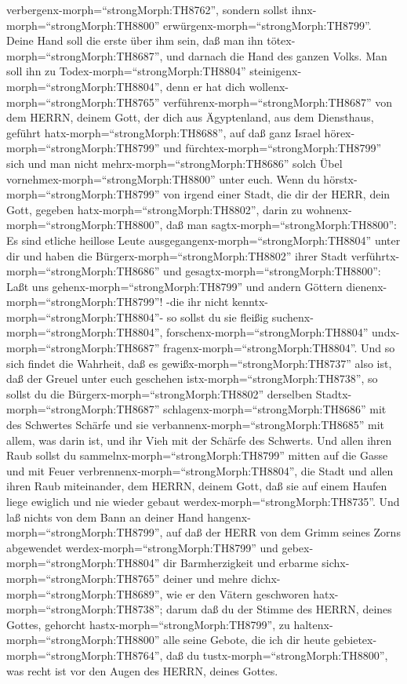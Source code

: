 verbergenx-morph=``strongMorph:TH8762'',  sondern sollst
ihnx-morph=``strongMorph:TH8800''
erwürgenx-morph=``strongMorph:TH8799''. Deine Hand soll die erste über
ihm sein, daß man ihn tötex-morph=``strongMorph:TH8687'', und darnach
die Hand des ganzen Volks.  Man soll ihn zu
Todex-morph=``strongMorph:TH8804''
steinigenx-morph=``strongMorph:TH8804'', denn er hat dich
wollenx-morph=``strongMorph:TH8765''
verführenx-morph=``strongMorph:TH8687'' von dem HERRN, deinem Gott, der
dich aus Ägyptenland, aus dem Diensthaus, geführt
hatx-morph=``strongMorph:TH8688'',  auf daß ganz Israel
hörex-morph=``strongMorph:TH8799'' und
fürchtex-morph=``strongMorph:TH8799'' sich und man nicht
mehrx-morph=``strongMorph:TH8686'' solch Übel
vornehmex-morph=``strongMorph:TH8800'' unter euch.  Wenn du
hörstx-morph=``strongMorph:TH8799'' von irgend einer Stadt, die dir der
HERR, dein Gott, gegeben hatx-morph=``strongMorph:TH8802'', darin zu
wohnenx-morph=``strongMorph:TH8800'', daß man
sagtx-morph=``strongMorph:TH8800'':  Es sind etliche
heillose Leute ausgegangenx-morph=``strongMorph:TH8804'' unter dir und
haben die Bürgerx-morph=``strongMorph:TH8802'' ihrer Stadt
verführtx-morph=``strongMorph:TH8686'' und
gesagtx-morph=``strongMorph:TH8800'': Laßt uns
gehenx-morph=``strongMorph:TH8799'' und andern Göttern
dienenx-morph=``strongMorph:TH8799''! -die ihr nicht
kenntx-morph=``strongMorph:TH8804''-  so sollst du sie
fleißig suchenx-morph=``strongMorph:TH8804'',
forschenx-morph=``strongMorph:TH8804'' undx-morph=``strongMorph:TH8687''
fragenx-morph=``strongMorph:TH8804''. Und so sich findet die Wahrheit,
daß es gewißx-morph=``strongMorph:TH8737'' also ist, daß der Greuel
unter euch geschehen istx-morph=``strongMorph:TH8738'',  so
sollst du die Bürgerx-morph=``strongMorph:TH8802'' derselben
Stadtx-morph=``strongMorph:TH8687''
schlagenx-morph=``strongMorph:TH8686'' mit des Schwertes Schärfe und sie
verbannenx-morph=``strongMorph:TH8685'' mit allem, was darin ist, und
ihr Vieh mit der Schärfe des Schwerts.  Und allen ihren
Raub sollst du sammelnx-morph=``strongMorph:TH8799'' mitten auf die
Gasse und mit Feuer verbrennenx-morph=``strongMorph:TH8804'', die Stadt
und allen ihren Raub miteinander, dem HERRN, deinem Gott, daß sie auf
einem Haufen liege ewiglich und nie wieder gebaut
werdex-morph=``strongMorph:TH8735''.  Und laß nichts von
dem Bann an deiner Hand hangenx-morph=``strongMorph:TH8799'', auf daß
der HERR von dem Grimm seines Zorns abgewendet
werdex-morph=``strongMorph:TH8799'' und
gebex-morph=``strongMorph:TH8804'' dir Barmherzigkeit und erbarme
sichx-morph=``strongMorph:TH8765'' deiner und mehre
dichx-morph=``strongMorph:TH8689'', wie er den Vätern geschworen
hatx-morph=``strongMorph:TH8738'';  darum daß du der Stimme
des HERRN, deines Gottes, gehorcht hastx-morph=``strongMorph:TH8799'',
zu haltenx-morph=``strongMorph:TH8800'' alle seine Gebote, die ich dir
heute gebietex-morph=``strongMorph:TH8764'', daß du
tustx-morph=``strongMorph:TH8800'', was recht ist vor den Augen des
HERRN, deines Gottes.


